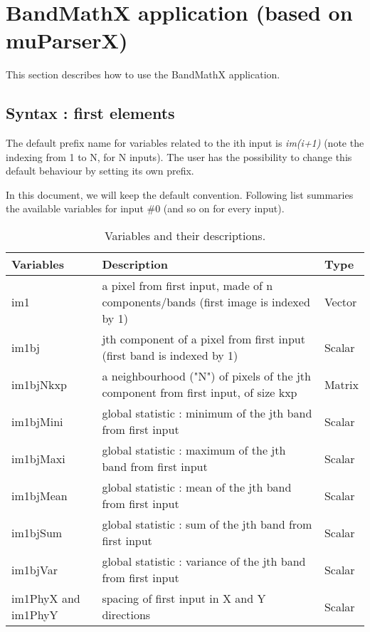 \newpage
\section{BandMathX application (based on muParserX)}\label{sec:bandmathx}
This section describes how to use the BandMathX application.



\subsection{Syntax : first elements}\label{ssec:syntax}

The default prefix name for variables related to the ith input is \textit{im(i+1)} 
(note the indexing from 1 to N, for N inputs). The user has the 
possibility to change this default behaviour by setting its own prefix.


In this document, we will keep the default convention. Following list 
summaries the available variables for input \#0 (and so on for every input).

\begin{center}
\begin{table}
\begin{tabular}{||l|l|l||}
\hline
\bf Variables & \bf Description & \bf Type \\
\hline\hline
im1 & a pixel from first input, made of n components/bands (first image is indexed by 1) & Vector \\
im1bj & jth component of a pixel from first input (first band is indexed by 1) & Scalar \\
im1bjNkxp & a neighbourhood ("N") of pixels of the jth component from first input, of size kxp & Matrix \\
im1bjMini & global statistic : minimum of the jth band from first input & Scalar \\
im1bjMaxi & global statistic : maximum of the jth band from first input & Scalar \\
im1bjMean & global statistic : mean of the jth band from first input & Scalar \\
im1bjSum & global statistic : sum of the jth band from first input & Scalar \\
im1bjVar & global statistic : variance of the jth band from first input & Scalar \\
im1PhyX and im1PhyY & spacing of first input in X and Y directions & Scalar \\
\hline
\end{tabular}
\caption{Variables and their descriptions.}
\label{variables}
\end{table}
\end{center}

